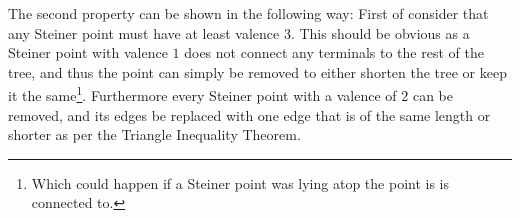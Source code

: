 The second property can be shown in the following way: First of consider that
any Steiner point must have at least valence $3$. This should be obvious as a
Steiner point with valence $1$ does not connect any terminals to the rest of the
tree, and thus the point can simply be removed to either shorten the tree or
keep it the same\footnote{Which could happen if a Steiner point was lying atop
  the point is is connected to.}. Furthermore every Steiner point with a valence
of $2$ can be removed, and its edges be replaced with one edge that is of the
same length or shorter as per the Triangle Inequality
Theorem\cite{triangleinequality}.







